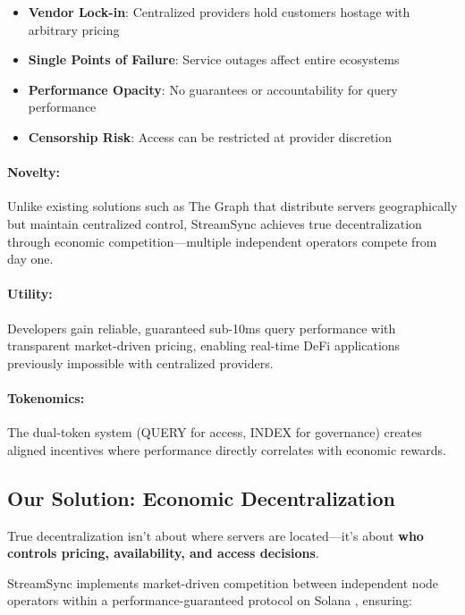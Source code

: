 \documentclass[12pt,a4paper]{article}
\begin{document}
\begin{itemize}
    \item \textbf{Vendor Lock-in}: Centralized providers hold customers hostage with arbitrary pricing \cite{defillamainfra2024}
    \item \textbf{Single Points of Failure}: Service outages affect entire ecosystems
    \item \textbf{Performance Opacity}: No guarantees or accountability for query performance
    \item \textbf{Censorship Risk}: Access can be restricted at provider discretion
\end{itemize}

\paragraph{Novelty:} Unlike existing solutions such as The Graph \cite{thegraph2020} that distribute servers geographically but maintain centralized control, StreamSync achieves true decentralization through economic competition—multiple independent operators compete from day one.

\paragraph{Utility:} Developers gain reliable, guaranteed sub-10ms query performance with transparent market-driven pricing, enabling real-time DeFi applications previously impossible with centralized providers.

\paragraph{Tokenomics:} The dual-token system (QUERY for access, INDEX for governance) creates aligned incentives where performance directly correlates with economic rewards.

\subsection{Our Solution: Economic Decentralization}

True decentralization isn't about where servers are located—it's about \textbf{who controls pricing, availability, and access decisions}.

StreamSync implements market-driven competition between independent node operators within a performance-guaranteed protocol on Solana \cite{solana2020}, ensuring:
\end{document}
